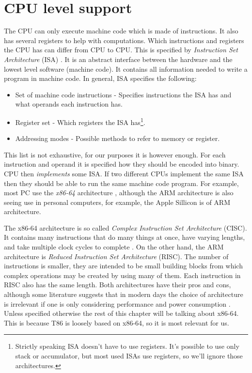 \section{CPU level support}
The CPU can only execute machine code which is made of instructions. It also
has several registers to help with computations. Which instructions and
registers the CPU has can differ from CPU to CPU. This is specified by
\textit{Instruction Set Architecture} (ISA) \cite{aps-isa}. It is an abstract
interface between the hardware and the lowest level software (machine code). It
contains all information needed to write a program in machine code. In general,
ISA specifies the following: 
\begin{itemize}
    \item Set of machine code instructions - Specifies instructions the ISA has
        and what operands each instruction has.
    \item Register set - Which registers the ISA has\footnote{Strictly speaking
        ISA doesn't have to use registers. It's possible to use only stack or
        accumulator, but most used ISAs use registers, so we'll ignore those
        architectures. }.   
    \item Addressing modes - Possible methods to refer to memory or register. 
\end{itemize}
This list is not exhaustive, for our purposes it is however enough. For each
instruction and operand it is specified how they should be encoded into binary.
CPU then \textit{implements} some ISA. If two different CPUs implement the same
ISA then they should be able to run the same machine code program. For example,
most PC use the \textit{x86-64} architecture \cite{aps-isa}, although the ARM
architecture is also seeing use in personal computers, for example, the Apple
Sillicon is of ARM architecture.

The x86-64 architecture is so called \textit{Complex Instruction Set Architecture}
(CISC). It contains many instructions that do many things at once, have varying
lengths, and take multiple clock cycles to complete \cite{intel-manual}. On the
other hand, the ARM architecture is \textit{Reduced Instruction Set
Architecture} (RISC). The number of instructions is smaller, they are intended
to be small building blocks from which complex operations may be created by
using many of them. Each instruction in RISC also has the same length. Both
architectures have their pros and cons, although some literature suggests that
in modern days the choice of architecture is irrelevant if one is only
considering performance and power consumption \cite{riscvscisc1, riscvscisc2}.
Unless specified otherwise the rest of this chapter will be talking about x86-64.
This is because T86  is loosely based on x86-64, so it is most relevant
for us.

